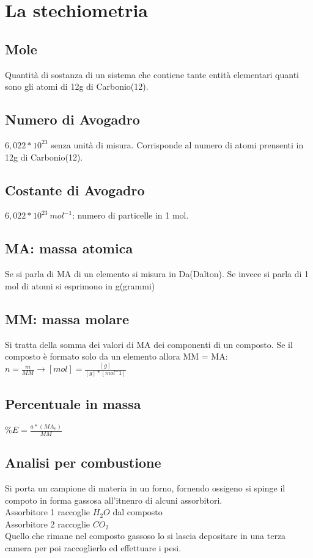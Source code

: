 \section{La stechiometria}
\subsection{Mole}
Quantità di sostanza di un sistema che contiene tante entità elementari quanti sono gli atomi di 12g di Carbonio(12).
\subsection{Numero di Avogadro}
$6,022*10^{23}$ senza unità di misura. Corrisponde al numero di atomi prensenti in 12g di Carbonio(12).
\subsection{Costante di Avogadro}
$6,022*10^{23}\ mol^{-1}$: numero di particelle in 1 mol.
\subsection{MA: massa atomica}
Se si parla di MA di un elemento si misura in Da(Dalton). Se invece si parla di 1 mol di atomi si esprimono in g(grammi)
\subsection{MM: massa molare}
Si tratta della somma dei valori di MA dei componenti di un composto. Se il composto è formato solo da un elemento allora MM = MA:\\
$n = \frac{m}{MM} \rightarrow [mol] = \frac{[g]}{[g]*[mol^-1]}$
\subsection{Percentuale in massa}
$\%E = \frac{a * (MA_e)}{MM}$
\subsection{Analisi per combustione}
Si porta un campione di materia in un forno, fornendo ossigeno si spinge il compoto in forma gassosa all'itnenro di alcuni assorbitori.\\
Assorbitore 1 raccoglie $H_2O$ dal composto\\
Assorbitore 2 raccoglie $CO_2$\\
Quello che rimane nel composto gassoso lo si lascia depositare in una terza camera per poi raccoglierlo ed effettuare i pesi.
